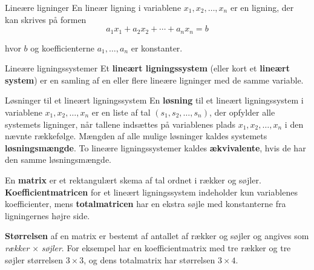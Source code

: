 

\begin{definition}{Lineære ligninger} En lineær ligning i variablene $x_1, x_2, \ldots, x_n$ er en ligning, der kan skrives på formen
\[
a_1 x_1 + a_2 x_2 + \cdots + a_n x_n = b
\]

hvor $b$ og koefficienterne $a_1, \ldots, a_n$ er konstanter.

\end{definition}

\begin{definition}{Lineære ligningssystemer} Et \textbf{lineært ligningssystem} (eller kort et \textbf{lineært system}) er en samling af en eller flere lineære ligninger med de samme variable. \end{definition}

\begin{definition}{Løsninger til et lineært ligningssystem} En \textbf{løsning} til et lineært ligningssystem i variablene $x_1, x_2, \ldots, x_n$ er en liste af tal $(s_1, s_2, \ldots, s_n)$, der opfylder alle systemets ligninger, når tallene indsættes på variablenes plads $x_1, x_2, \ldots, x_n$ i den nævnte rækkefølge. Mængden af alle mulige løsninger kaldes systemets \textbf{løsningsmængde}. To lineære ligningssystemer kaldes \textbf{ækvivalente}, hvis de har den samme løsningsmængde. \end{definition}

\begin{definition} En \textbf{matrix} er et rektangulært skema af tal ordnet i rækker og søjler. \textbf{Koefficientmatricen} for et lineært ligningssystem indeholder kun variablenes koefficienter, mens \textbf{totalmatricen} har en ekstra søjle med konstanterne fra ligningernes højre side. \end{definition}

\begin{definition} \textbf{Størrelsen} af en matrix er bestemt af antallet af rækker og søjler og angives som \emph{rækker} $\times$ \emph{søjler}. For eksempel har en koefficientmatrix med tre rækker og tre søjler størrelsen $3 \times 3$, og dens totalmatrix har størrelsen $3 \times 4$. \end{definition}


